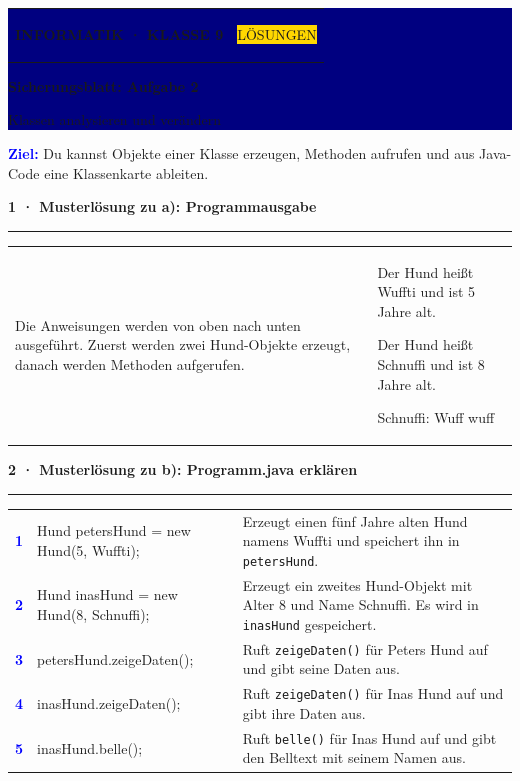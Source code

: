 \documentclass[10pt,a4paper]{article}
\newcommand{\sectiontitle}[2]{%
  \vspace{2.3mm}
  {\color{#1}\bfseries\large #2}\par
  \vspace{0.8mm}
  {\color{#1}\rule{\linewidth}{0.7pt}}\par
  \vspace{1.2mm}
}
\newcommand{\solutionrow}[3]{%
  \textcolor{Blue}{\bfseries #1} &
  \ttfamily\small #2 &
  \small #3 \\[1.8mm]
}
\begin{document}
\colorbox{Navy}{%
  \parbox{\dimexpr\linewidth-2\fboxsep\relax}{%
    \vspace{3mm}
    \color{white}
    \begin{tabularx}{\linewidth}{@{}Xr@{}}
      {\small\bfseries INFORMATIK · KLASSE 9} &
      \colorbox{Gold}{\color{Navy}\small\bfseries\strut LÖSUNGEN}
    \end{tabularx}
    \vspace{2.5mm}

    {\fontsize{22}{25}\selectfont\bfseries Sicherungsblatt: Aufgabe 2}\par
    \vspace{1mm}
    {\large Klassen analysieren und verändern}
    \vspace{3mm}
  }%
}

\vspace{3mm}
\colorbox{Sky}{%
  \parbox{\dimexpr\linewidth-2\fboxsep\relax}{%
    \vspace{1.8mm}
    \textcolor{Blue}{\bfseries Ziel:}
    Du kannst Objekte einer Klasse erzeugen, Methoden aufrufen und aus
    Java-Code eine Klassenkarte ableiten.
    \vspace{1.8mm}
  }%
}

\sectiontitle{Blue}{1 · Musterlösung zu a): Programmausgabe}

\begin{tabularx}{\linewidth}{@{}X X@{}}
  \small Die Anweisungen werden von oben nach unten ausgeführt. Zuerst werden
  zwei Hund-Objekte erzeugt, danach werden Methoden aufgerufen. &
  \colorbox{CodeBg}{\parbox{\dimexpr\linewidth-4mm\relax}{%
    \ttfamily\small
    Der Hund heißt Wuffti und ist 5 Jahre alt.\par
    Der Hund heißt Schnuffi und ist 8 Jahre alt.\par
    Schnuffi: Wuff wuff
  }}
\end{tabularx}

\sectiontitle{Blue}{2 · Musterlösung zu b): Programm.java erklären}

\renewcommand{\arraystretch}{1.03}
\begin{tabularx}{\linewidth}{@{}>{\centering\arraybackslash}p{7mm} >{\raggedright\arraybackslash}p{77mm} X@{}}
  \solutionrow{1}{Hund petersHund = new Hund(5, \textquotedbl{}Wuffti\textquotedbl{});}{Erzeugt einen fünf Jahre alten Hund namens Wuffti und speichert ihn in \texttt{petersHund}.}
  \solutionrow{2}{Hund inasHund = new Hund(8, \textquotedbl{}Schnuffi\textquotedbl{});}{Erzeugt ein zweites Hund-Objekt mit Alter 8 und Name Schnuffi. Es wird in \texttt{inasHund} gespeichert.}
  \solutionrow{3}{petersHund.zeigeDaten();}{Ruft \texttt{zeigeDaten()} für Peters Hund auf und gibt seine Daten aus.}
  \solutionrow{4}{inasHund.zeigeDaten();}{Ruft \texttt{zeigeDaten()} für Inas Hund auf und gibt ihre Daten aus.}
  \solutionrow{5}{inasHund.belle();}{Ruft \texttt{belle()} für Inas Hund auf und gibt den Belltext mit seinem Namen aus.}
\end{tabularx}
\end{document}
